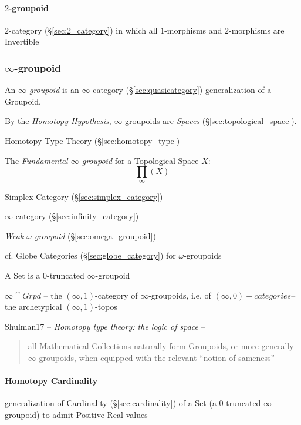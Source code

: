 \paragraph{$2$-groupoid}\label{sec:2_groupoid}\hfill

$2$-category (\S\ref{sec:2_category}) in which all $1$-morphisms and
$2$-morphisms are Invertible



\subsubsection{$\infty$-groupoid}\label{sec:infinity_groupoid}

An \emph{$\infty$-groupoid} is an $\infty$-category
(\S\ref{sec:quasicategory}) generalization of a Groupoid.

By the \emph{Homotopy Hypothesis}, $\infty$-groupoids are \emph{Spaces}
(\S\ref{sec:topological_space}).

Homotopy Type Theory (\S\ref{sec:homotopy_type})

The \emph{Fundamental $\infty$-groupoid} for a Topological Space $X$:
\[
  \prod_\infty(X)
\]

Simplex Category (\S\ref{sec:simplex_category})

\fist $\infty$-category (\S\ref{sec:infinity_category})

\emph{Weak $\omega$-groupoid} (\S\ref{sec:omega_groupoid})

\fist cf. Globe Categories (\S\ref{sec:globe_category}) for
$\omega$-groupoids

A Set is a $0$-truncated $\infty$-groupoid %

$\infty\cat{Grpd}$ -- the $(\infty,1)$-category of $\infty$-groupoids,
i.e. of $(\infty,0)-categories$-- the archetypical
$(\infty,1)$-topos %

Shulman17 -- \emph{Homotopy type theory: the logic of space} --
\begin{quote}
all Mathematical Collections naturally form Groupoids, or more
generally $\infty$-groupoids, when equipped with the relevant ``notion
of sameness''
\end{quote}



\paragraph{Homotopy Cardinality}\label{sec:homotopy_cardinality}\hfill

generalization of Cardinality (\S\ref{sec:cardinality}) of a Set (a
$0$-truncated $\infty$-groupoid) to admit Positive Real values

